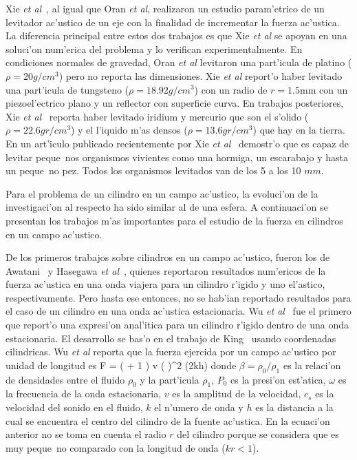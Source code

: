 Xie {\it et al}~\cite{xie01}, al igual que Oran {\it et al}, realizaron un estudio param'etrico de un levitador
ac'ustico de un eje  con la finalidad de incrementar la fuerza ac'ustica. La diferencia principal entre estos
dos trabajos es que Xie {\it et al} se apoyan en una soluci'on num'erica del problema y lo verifican 
experimentalmente. En condiciones normales de gravedad, Oran {\it et al} levitaron una part'icula de
platino ($\rho=20 g/cm^3$) pero no reporta las dimensiones. Xie {\it et al} report'o haber 
levitado una part'icula de tungsteno ($\rho=18.92 g/cm^3$) con un radio de $r=1.5$mm con un piezoel'ectrico
plano y un reflector con superficie curva.  En trabajos posteriores, Xie {\it et al}~\cite{xie02,xie02c} reporta
haber levitado iridium y mercurio que son el s'olido ($\rho=22.6 gr/cm^3$) y el l'iquido m'as
densos ($\rho=13.6 gr/cm^3$)  que hay en la tierra. En un art'iculo publicado recientemente por 
Xie {\it et al}~\cite{xie06} demostr'o que es capaz de levitar peque~nos organismos vivientes como una
hormiga, un escarabajo y hasta un peque~no pez. Todos los organismos levitados van de los 5 a los 10 $mm$. 
 
Para el problema de un cilindro en un campo ac'ustico, la evoluci'on de la investigaci'on
al respecto ha sido similar al de una esfera. A continuaci'on se presentan los trabajos m'as
importantes para el estudio de la fuerza en  cilindros en un campo ac'ustico.

De los primeros trabajos sobre cilindros en un campo ac'ustico, fueron los de
Awatani~\cite{awatani55} y Hasegawa {\it et al}~\cite{hasegawa88}, quienes  reportaron  resultados
num'ericos de la fuerza ac'ustica en una onda viajera para un cilindro r'igido y uno el'astico, respectivamente. Pero
hasta ese entonces, no se hab'ian reportado resultados para el caso de un cilindro en una onda ac'ustica estacionaria.
Wu {\it et al}~\cite{wu90} fue el primero que report'o una expresi'on anal'itica para un cilindro r'igido dentro de una
onda estacionaria. El desarrollo se bas'o en el trabajo de King~\cite{king34} usando coordenadas cilindricas. 
Wu {\it et al} reporta que la fuerza ejercida por un campo ac'ustico por unidad de longitud es
\BE\label{eq:force-wu}
F = \left(  + 1 \right) v \omega \left(  \right)^2 \sin (2kh)
\EE
donde $\beta=\rho_0/\rho_1$ es la relaci'on de densidades entre el fluido $\rho_0$ y la part'icula $\rho_1$, $P_0$ es la
presi'on est'atica, $\omega$ es la frecuencia de la onda estacionaria, $v$ es la amplitud de la velocidad, $c_s$ es la
velocidad del sonido en el fluido, $k$ el n'umero de onda y $h$ es la distancia a la cual se encuentra el centro del 
cilindro de la fuente ac'ustica. En la ecuaci'on anterior no se toma en cuenta el
radio $r$ del cilindro porque se considera que es muy peque~no comparado con la longitud de onda ($kr<1$).

